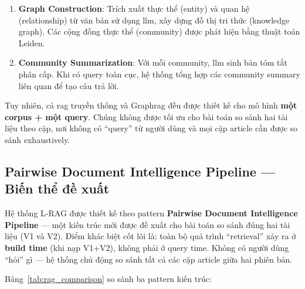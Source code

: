 \begin{enumerate}[label=(\arabic*)]
    \item \textbf{Graph Construction}: Trích xuất thực thể (entity) và quan hệ (relationship) từ văn bản sử dụng \gls{llm}, xây dựng đồ thị tri thức (knowledge graph). Các cộng đồng thực thể (community) được phát hiện bằng thuật toán Leiden.
    \item \textbf{Community Summarization}: Với mỗi community, \gls{llm} sinh bản tóm tắt phân cấp. Khi có query toàn cục, hệ thống tổng hợp các community summary liên quan để tạo câu trả lời.
\end{enumerate}

Tuy nhiên, cả \gls{rag} truyền thống và Graph\gls{rag} đều được thiết kế cho mô hình \textbf{một corpus + một query}. Chúng không được tối ưu cho bài toán so sánh hai tài liệu theo cặp, nơi không có ``query'' từ người dùng và mọi cặp article cần được so sánh exhaustively.

\subsection{Pairwise Document Intelligence Pipeline — Biến thể đề xuất}

Hệ thống L-RAG được thiết kế theo pattern \textbf{Pairwise Document Intelligence Pipeline} — một kiến trúc mới được đề xuất cho bài toán so sánh đúng hai tài liệu (V1 và V2). Điểm khác biệt cốt lõi là: toàn bộ quá trình ``retrieval'' xảy ra ở \textbf{build time} (khi nạp V1+V2), không phải ở query time. Không có người dùng ``hỏi'' gì — hệ thống chủ động so sánh tất cả các cặp article giữa hai phiên bản.

Bảng~\ref{tab:rag_comparison} so sánh ba pattern kiến trúc:

